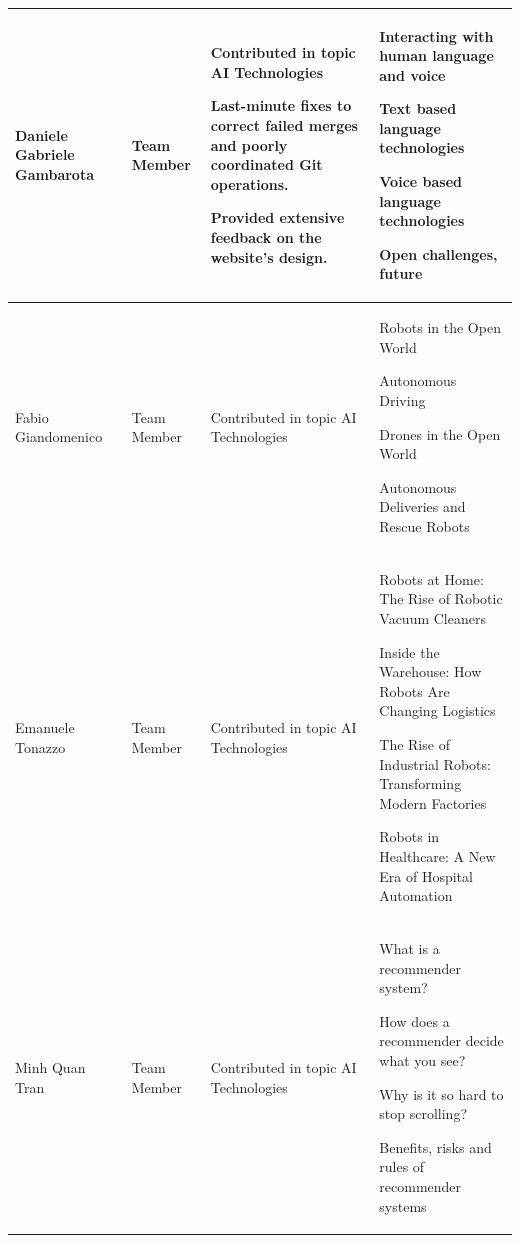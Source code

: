\documentclass[11pt]{article}
\begin{document}
\begin{longtable} [c] {|p{3cm}|l|p{7cm}|p{4cm}|}
	Daniele Gabriele Gambarota & Team Member &
	\par \textbullet{} Contributed in topic AI Technologies
	\par \textbullet{} Last-minute fixes to correct failed merges and poorly coordinated Git operations.
	\par \textbullet{} Provided extensive feedback on the website's design. &
	\par \textbullet{} Interacting with human language and voice
	\par \textbullet{} Text based language technologies
	\par \textbullet{} Voice based language technologies
	\par \textbullet{} Open challenges, future \\ 
	\hline
	
	Fabio Giandomenico & Team Member &
	\par \textbullet{} Contributed in topic AI Technologies &
	\par \textbullet{} Robots in the Open World
	\par \textbullet{} Autonomous Driving
	\par \textbullet{} Drones in the Open World
	\par \textbullet{} Autonomous Deliveries and Rescue Robots \\ 
	\hline
	
	Emanuele Tonazzo & Team Member &
	\par \textbullet{} Contributed in topic AI Technologies &
	\par \textbullet{} Robots at Home: The Rise of Robotic Vacuum Cleaners
	\par \textbullet{} Inside the Warehouse: How Robots Are Changing Logistics
	\par \textbullet{} The Rise of Industrial Robots: Transforming Modern Factories
	\par \textbullet{} Robots in Healthcare: A New Era of Hospital Automation \\ 
	\hline
	
	Minh Quan Tran & Team Member &
	\par \textbullet{} Contributed in topic AI Technologies &
	\par \textbullet{} What is a recommender system?
	\par \textbullet{} How does a recommender decide what you see?
	\par \textbullet{} Why is it so hard to stop scrolling?
	\par \textbullet{} Benefits, risks and rules of recommender systems \\ 
	\hline
	

\end{longtable}
\end{document}
